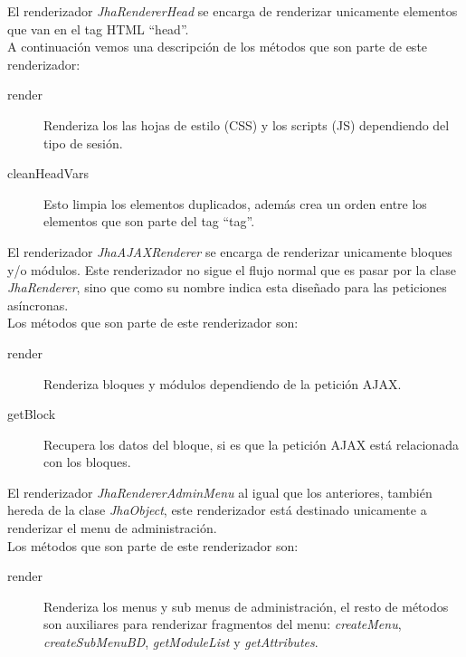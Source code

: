 

El renderizador \textit{JhaRendererHead} se encarga de renderizar unicamente elementos que van en el tag HTML ``head''.\\
A continuaci\'on vemos una descripci\'on de los m\'etodos que son parte de este renderizador:
\begin{description}
\item[render] Renderiza los las hojas de estilo (CSS) y los scripts (JS) dependiendo del tipo de sesi\'on.
\item[cleanHeadVars] Esto limpia los elementos duplicados, adem\'as crea un orden entre los elementos que son parte del tag ``tag''.
\end{description}



El renderizador \textit{JhaAJAXRenderer} se encarga de renderizar unicamente bloques y/o m\'odulos. Este renderizador no sigue el flujo normal que es pasar por la clase \textit{JhaRenderer}, sino que como su nombre indica esta dise\~nado para las peticiones as\'incronas.\\
Los m\'etodos que son parte de este renderizador son:
\begin{description}
\item[render] Renderiza bloques y m\'odulos dependiendo de la petici\'on AJAX.
\item[getBlock] Recupera los datos del bloque, si es que la petici\'on AJAX est\'a relacionada con los bloques.
\end{description}



El renderizador \textit{JhaRendererAdminMenu} al igual que los anteriores, tambi\'en hereda de la clase \textit{JhaObject}, este renderizador est\'a destinado unicamente a renderizar el menu de administraci\'on.\\
Los m\'etodos que son parte de este renderizador son:
\begin{description}
\item[render] Renderiza los menus y sub menus de administraci\'on, el resto de m\'etodos son auxiliares para renderizar fragmentos del menu: \textit{createMenu}, \textit{createSubMenuBD}, \textit{getModuleList} y \textit{getAttributes}.
\end{description}



